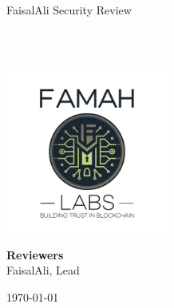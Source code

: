 \begin{titlepage}
  \vbox{}
  \vbox{}

  \begin{center}


    \noindent\makebox[\linewidth]{\rule{.7\paperwidth}{.6pt}}\\[0.7cm]

    { \huge \bfseries

      FaisalAli Security Review
    }\\[0.25cm]
    
    \noindent\makebox[\linewidth]{\rule{.7\paperwidth}{.6pt}}\\[0.7cm]

    
    \vfill

    \includegraphics[width=0.40\textwidth]{img/logo.png}

    
    \large
    {\bfseries Reviewers}\\
    
    FaisalAli, Lead

    {\large \today}

  \end{center}

\end{titlepage}